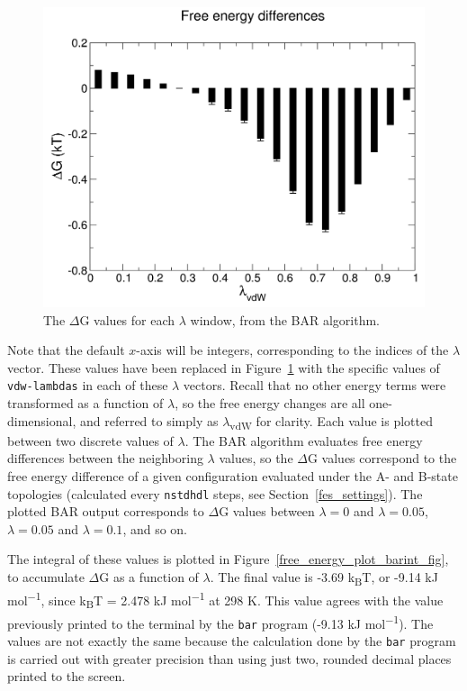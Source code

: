 \documentclass[9pt,tutorial]{livecoms}
\begin{document}
\begin{figure}[h!]
\centering
\includegraphics{free_energy_plot_bar}
\caption{The $\Delta$G values for each $\lambda$ window, from the BAR algorithm.}
\label{free_energy_plot_bar_fig}
\end{figure}

Note that the default $x$-axis will be integers, corresponding to the indices of the $\lambda$ vector. These values have been replaced in Figure~\ref{free_energy_plot_bar_fig} with the specific values of \texttt{vdw-lambdas} in each of these $\lambda$ vectors. Recall that no other energy terms were transformed as a function of $\lambda$, so the free energy changes are all one-dimensional, and referred to simply as $\lambda$\textsubscript{vdW} for clarity. Each value is plotted between two discrete values of $\lambda$. The BAR algorithm evaluates free energy differences between the neighboring $\lambda$ values, so the $\Delta$G values correspond to the free energy difference of a given configuration evaluated under the A- and B-state topologies (calculated every \texttt{nstdhdl} steps, see Section~\ref{fes_settings}). The plotted BAR output corresponds to $\Delta$G values between $\lambda = 0$ and $\lambda = 0.05$, $\lambda = 0.05$ and $\lambda = 0.1$, and so on.

The integral of these values is plotted in Figure~\ref{free_energy_plot_barint_fig}, to accumulate $\Delta$G as a function of $\lambda$. The final value is -3.69 k\textsubscript{B}T, or -9.14 kJ mol\textsuperscript{$-$1}, since k\textsubscript{B}T = 2.478 kJ mol\textsuperscript{$-$1} at 298 K. This value agrees with the value previously printed to the terminal by the \texttt{bar} program (-9.13 kJ mol\textsuperscript{$-$1}). The values are not exactly the same because the calculation done by the \texttt{bar} program is carried out with greater precision than using just two, rounded decimal places printed to the screen.
\end{document}
